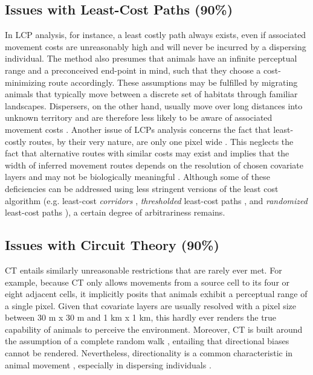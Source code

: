 \documentclass[abstract=on,10pt,a4paper,bibliography=totocnumbered]{article}
\begin{document}
\subsection{Issues with Least-Cost Paths (90\%)}
In LCP analysis, for instance, a least costly path always exists, even if
associated movement costs are unreasonably high and will never be incurred by a
dispersing individual. The method also presumes that animals have an infinite
perceptual range and a preconceived end-point in mind, such that they choose a
cost-minimizing route accordingly. These assumptions may be fulfilled by
migrating animals that typically move between a discrete set of habitats through
familiar landscapes. Dispersers, on the other hand, usually move over long
distances into unknown territory and are therefore less likely to be aware of
associated movement costs \citep{Koen.2014, Abrahms.2017, Cozzi.2020}. Another
issue of LCPs analysis concerns the fact that least-costly routes, by their very
nature, are only one pixel wide \citep{Pinto.2009}. This neglects the fact that
alternative routes with similar costs may exist and implies that the width of
inferred movement routes depends on the resolution of chosen covariate layers
and may not be biologically meaningful \citep{Diniz.2020}. Although some of
these deficiencies can be addressed using less stringent versions of the least
cost algorithm (e.g. least-cost \textit{corridors} \citep{Pinto.2009},
\textit{thresholded} least-cost paths \citep{Landguth.2012}, and
\textit{randomized} least-cost paths \citep{Panzacchi.2016, VanMoorter.2021}), a
certain degree of arbitrariness remains.

\subsection{Issues with Circuit Theory (90\%)}
CT entails similarly unreasonable restrictions that are rarely ever met. For
example, because CT only allows movements from a source cell to its four or
eight adjacent cells, it implicitly posits that animals exhibit a perceptual
range of a single pixel. Given that covariate layers are usually resolved with a
pixel size between 30 m x 30 m and 1 km x 1 km, this hardly ever renders the
true capability of animals to perceive the environment. Moreover, CT is built
around the assumption of a complete random walk \citep{Diniz.2020}, entailing
that directional biases cannot be rendered. Nevertheless, directionality is a
common characteristic in animal movement \citep{Bovet.1991, Schultz.2001},
especially in dispersing individuals \citep{Cozzi.2020, Hofmann.2021}.
\end{document}
